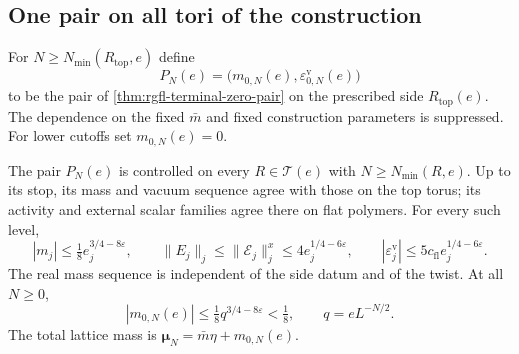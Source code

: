 \subsection{One pair on all tori of the construction}
\label{subsec:rgfl-volume-comparison}

For $N\ge N_{\min}(R_{\mathrm{top}},e)$ define
\[
 P_N(e)=\big(m_{0,N}(e),\varepsilon_{0,N}^{\mathrm v}(e)\big)
\]
to be the pair of \cref{thm:rgfl-terminal-zero-pair}
on the prescribed side $R_{\mathrm{top}}(e)$.
The dependence on the fixed $\bar m$ and fixed
construction parameters is suppressed.
For lower cutoffs set $m_{0,N}(e)=0$.

\begin{theorem}\label{thm:rgfl-common-pair}
The pair $P_N(e)$ is controlled on every
$R\in\mathcal T(e)$ with $N\ge N_{\min}(R,e)$.
Up to its stop, its mass and vacuum sequence agree
with those on the top torus; its activity and
external scalar families agree there on flat polymers.
For every such level,
\begin{equation}\label{eq:rgfl-common-bounds}
 |m_j|\le\tfrac18e_j^{3/4-8\varepsilon},\qquad
 \|E_j\|_j\le\|\mathscr E_j\|_j^x
                             \le4e_j^{1/4-6\varepsilon},\qquad
 |\varepsilon_j^{\mathrm v}|
                         \le5c_{\mathrm{fl}}e_j^{1/4-6\varepsilon}.
\end{equation}
The real mass sequence is independent of the side
datum and of the twist. At all $N\ge0$,
\begin{equation}\label{eq:rgfl-bare-mass-bound}
 |m_{0,N}(e)|\le\tfrac18q^{3/4-8\varepsilon}<\tfrac18,
                       \qquad q=eL^{-N/2}.
\end{equation}
The total lattice mass is
$\boldsymbol\mu_N=\bar m\eta+m_{0,N}(e)$.
\end{theorem}

